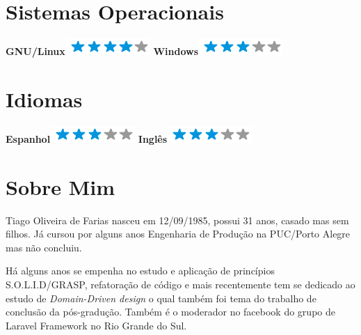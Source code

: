 \documentclass[]{friggeri-cv}
\begin{document}
\begin{aside}
  \section{Sistemas Operacionais}
    \textbf{GNU/Linux}\includegraphics[scale=0.40]{img/4stars.png}
    \textbf{Windows}\includegraphics[scale=0.40]{img/3stars.png}
    ~
  \section{Idiomas}
    \textbf{Espanhol}\includegraphics[scale=0.40]{img/3stars.png}
    \textbf{Inglês}\includegraphics[scale=0.40]{img/3stars.png}
    ~
\end{aside}

\section{Sobre Mim}

Tiago Oliveira de Farias nasceu em 12/09/1985, possui 31 anos, casado mas sem filhos. Já cursou por alguns anos Engenharia de Produção na PUC/Porto Alegre mas não concluiu.

Há alguns anos se empenha no estudo e aplicação de princípios S.O.L.I.D/GRASP, refatoração de código e mais recentemente tem se dedicado ao estudo de \textit{Domain-Driven design} o qual também foi tema do trabalho de conclusão da pós-gradução. Também é o moderador no facebook do grupo de Laravel Framework no Rio Grande do Sul.
\end{document}

